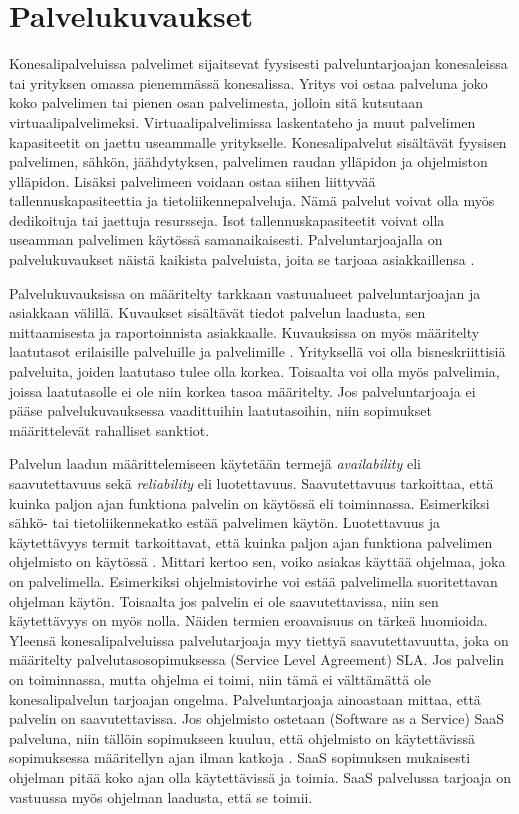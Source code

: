 \section{Palvelukuvaukset}
Konesalipalveluissa palvelimet sijaitsevat fyysisesti palveluntarjoajan konesaleissa tai yrityksen omassa pienemmässä konesalissa. Yritys voi ostaa palveluna joko koko palvelimen tai pienen osan palvelimesta, jolloin sitä kutsutaan virtuaalipalvelimeksi. Virtuaalipalvelimissa laskentateho ja muut palvelimen kapasiteetit on jaettu useammalle yritykselle. Konesalipalvelut sisältävät fyysisen palvelimen, sähkön, jäähdytyksen, palvelimen raudan ylläpidon ja ohjelmiston ylläpidon. Lisäksi palvelimeen voidaan ostaa siihen liittyvää tallennuskapasiteettia ja tietoliikennepalveluja. Nämä palvelut voivat olla myös dedikoituja tai jaettuja resursseja. Isot tallennuskapasiteetit voivat olla useamman palvelimen käytössä samanaikaisesti. Palveluntarjoajalla on palvelukuvaukset näistä kaikista palveluista, joita se tarjoaa asiakkaillensa \citep{handbook}.

Palvelukuvauksissa on määritelty tarkkaan vastuualueet palveluntarjoajan ja asiakkaan välillä. Kuvaukset sisältävät tiedot palvelun laadusta, sen mittaamisesta ja raportoinnista asiakkaalle. Kuvauksissa on myös määritelty laatutasot erilaisille palveluille ja palvelimille \citep{handbook}. Yrityksellä voi olla bisneskriittisiä palveluita, joiden laatutaso tulee olla korkea. Toisaalta voi olla myös palvelimia, joissa laatutasolle ei ole niin korkea tasoa määritelty. Jos palveluntarjoaja ei pääse palvelukuvauksessa vaadittuihin laatutasoihin, niin sopimukset määrittelevät rahalliset sanktiot.

Palvelun laadun määrittelemiseen käytetään termejä \emph{availability} eli saavutettavuus sekä \emph{reliability} eli luotettavuus. Saavutettavuus tarkoittaa, että kuinka paljon ajan funktiona palvelin on käytössä eli toiminnassa. Esimerkiksi sähkö- tai tietoliikennekatko estää palvelimen käytön. Luotettavuus ja käytettävyys termit tarkoittavat, että kuinka paljon ajan funktiona palvelimen ohjelmisto on käytössä \citep{service_availability} \citep{itil}. Mittari kertoo sen, voiko asiakas käyttää ohjelmaa, joka on palvelimella. Esimerkiksi ohjelmistovirhe voi estää palvelimella suoritettavan ohjelman käytön. Toisaalta jos palvelin ei ole saavutettavissa, niin sen käytettävyys on myös nolla. Näiden termien eroavaisuus on tärkeä huomioida. Yleensä konesalipalveluissa palvelutarjoaja myy tiettyä saavutettavuutta, joka on määritelty palvelutasosopimuksessa (Service Level Agreement) SLA. Jos palvelin on toiminnassa, mutta ohjelma ei toimi, niin tämä ei välttämättä ole konesalipalvelun tarjoajan ongelma. Palveluntarjoaja ainoastaan mittaa, että palvelin on saavutettavissa. Jos ohjelmisto ostetaan (Software as a Service) SaaS palveluna, niin tällöin sopimukseen kuuluu, että ohjelmisto on käytettävissä sopimuksessa määritellyn ajan ilman katkoja \citep{software_service}. SaaS sopimuksen mukaisesti ohjelman pitää koko ajan olla käytettävissä ja toimia. SaaS palvelussa tarjoaja on vastuussa myös ohjelman laadusta, että se toimii.

